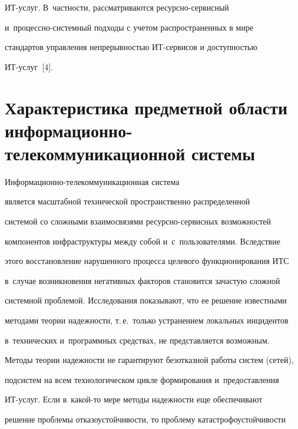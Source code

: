 ИТ-услуг. В~част\-ности, рассматриваются ресурсно-сервисный


  и~про\-цес\-сно-сис\-тем\-ный подходы с учетом распространенных в мире


стандартов управ\-ле\-ния непрерывностью ИТ-сервисов и доступностью


  ИТ-услуг~[4].


  


\vspace*{-2pt}





\section{Характеристика предметной области информационно-телекоммуникационной системы}





\vspace*{-1pt}





  Информационно-телекоммуникационная система


   является масштабной технической пространственно распределенной


системой со сложными взаимосвязями ре\-сурс\-но-сер\-вис\-ных возможностей


компонентов инфраструктуры между собой и~с~пользователями. Вследствие


этого восстановление нарушенного процесса целевого функционирования ИТС


в~случае возникновения негативных факторов становится зачастую сложной


системной проб\-ле\-мой. Исследования показывают, что ее решение известными


методами тео\-рии надежности, т.\,е.\ только устранением локальных инцидентов


в~технических и~программных средствах, не представляется возможным.


Методы тео\-рии надежности не гарантируют безотказной работы систем (сетей),


подсистем на всем технологическом цикле формирования и~предоставления


ИТ-услуг. Если в~ка\-кой-то мере методы надежности еще обеспечивают


решение проблемы отказоустойчивости, то проблему катастрофоустойчивости


